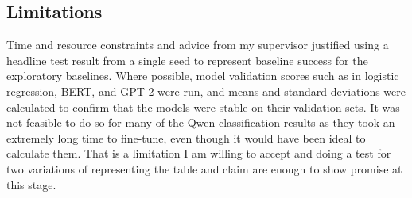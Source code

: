 \subsection{Limitations}
Time and resource constraints and advice from my supervisor justified using a headline test result from a single seed to represent baseline success for the exploratory baselines. Where possible, model validation scores such as in logistic regression, BERT, and GPT-2 were run, and means and standard deviations were calculated to confirm that the models were stable on their validation sets. It was not feasible to do so for many of the Qwen classification results as they took an extremely long time to fine-tune, even though it would have been ideal to calculate them. That is a limitation I am willing to accept and doing a test for two variations of representing the table and claim are enough to show promise at this stage. 
